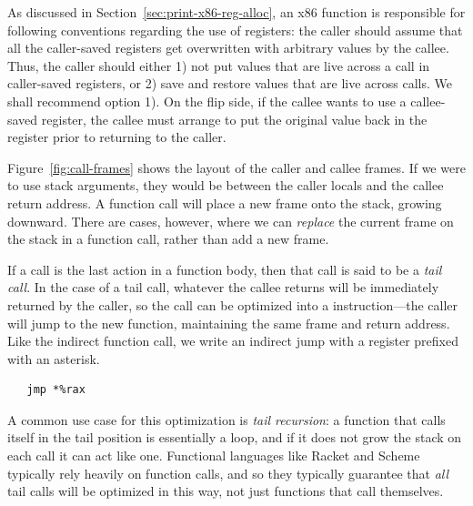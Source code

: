 \documentclass[11pt]{book}
\begin{document}

As discussed in Section~\ref{sec:print-x86-reg-alloc}, an x86 function
is responsible for following conventions regarding the use of
registers: the caller should assume that all the caller-saved
registers get overwritten with arbitrary values by the callee. Thus,
the caller should either 1) not put values that are live across a call
in caller-saved registers, or 2) save and restore values that are live
across calls. We shall recommend option 1).  On the flip side, if the
callee wants to use a callee-saved register, the callee must arrange
to put the original value back in the register prior to returning to
the caller.

Figure~\ref{fig:call-frames} shows the layout of the caller and callee
frames. If we were to use stack arguments, they would be between the
caller locals and the callee return address. A function call will
place a new frame onto the stack, growing downward. There are cases,
however, where we can \emph{replace} the current frame on the stack in
a function call, rather than add a new frame.

If a call is the last action in a function body, then that call is
said to be a \emph{tail call}. In the case of a tail call, whatever
the callee returns will be immediately returned by the caller, so the
call can be optimized into a  instruction---the caller will
jump to the new function, maintaining the same frame and return
address. Like the indirect function call, we write an indirect
jump with a register prefixed with an asterisk.

\begin{lstlisting}
   jmp *%rax
\end{lstlisting}

A common use case for this optimization is \emph{tail recursion}: a
function that calls itself in the tail position is essentially a loop,
and if it does not grow the stack on each call it can act like
one. Functional languages like Racket and Scheme typically rely
heavily on function calls, and so they typically guarantee that
\emph{all} tail calls will be optimized in this way, not just
functions that call themselves.
\end{document}
